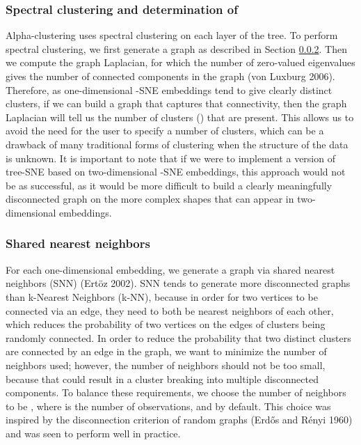 \documentclass{article}
\begin{document}
\subsubsection{Spectral clustering and determination of }

Alpha-clustering uses spectral clustering on each layer of the tree. To perform spectral clustering, we first generate a graph as described in Section \ref{snn-section}. Then we compute the graph Laplacian, for which the number of zero-valued eigenvalues gives the number of connected components in the graph (von Luxburg 2006). Therefore, as one-dimensional -SNE embeddings tend to give clearly distinct clusters, if we can build a graph that captures that connectivity, then the graph Laplacian will tell us the number of clusters () that are present. This allows us to avoid the need for the user to specify a number of clusters, which can be a drawback of many traditional forms of clustering when the structure of the data is unknown. It is important to note that if we were to implement a version of tree-SNE based on two-dimensional -SNE embeddings, this approach would not be as successful, as it would be more difficult to build a clearly meaningfully disconnected graph on the more complex shapes that can appear in two-dimensional embeddings.

\subsubsection{Shared nearest neighbors} \label{snn-section}

For each one-dimensional embedding, we generate a graph via shared nearest neighbors (SNN) (Ertöz 2002). SNN tends to generate more disconnected graphs than k-Nearest Neighbors (k-NN), because in order for two vertices to be connected via an edge, they need to both be nearest neighbors of each other, which reduces the probability of two vertices on the edges of clusters being randomly connected. In order to reduce the probability that two distinct clusters are connected by an edge in the graph, we want to minimize the number of neighbors used; however, the number of neighbors should not be too small, because that could result in a cluster breaking into multiple disconnected components. To balance these requirements, we choose the number of neighbors to be , where  is the number of observations, and  by default. This choice was inspired by the disconnection criterion of random graphs (Erdős and Rényi 1960) and was seen to perform well in practice. 
\end{document}
